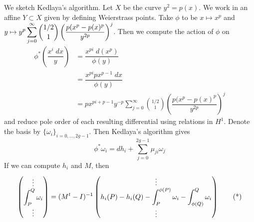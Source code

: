 \noindent{} \par\vspace{\baselineskip}
 

We sketch Kedlaya's algorithm. Let $X$ be the curve $y^2= p(x)$. We work in an affine $Y \subset X$ given by defining Weierstrass points. Take $\phi$ to be $x \mapsto x^p$ and $\displaystyle y \mapsto y^p \sum_{j=0}^\infty \binom{1/2}{1} \left( \dfrac{p(x^p - p(x)^p}{y^{2p}} \right)^j$. Then we compute the action of $\phi$ on
	\[
	\begin{aligned}
	\phi^*\left( \dfrac{x^i \;dx}{y} \right)&= \dfrac{x^{pi} \;d(x^p)}{\phi(y)} \\
	&= \dfrac{x^{pi} p x^{p-1} \;dx}{\phi(y)} \\
	&= p x^{pi + p - 1} y^{-p} \sum_{j=0}^\infty \binom{1/2}{1} \left( \dfrac{p(x^p - p(x)^p}{y^{2p}} \right)^j
	\end{aligned}
	\]
and reduce pole order of each resulting differential using relations in $H^1$. Denote the basis by $\{\omega_i\}_{i=0,\ldots,2g-1}$. Then Kedlaya's algorithm gives
	\[
	\phi^* \omega_i= dh_i + \sum_{j=0}^{2g-1} \mu_{ji} \omega_j
	\]
If we can compute $h_i$ and $M$, then
	\begin{equation} \label{eq:balk_star}
	\begin{pmatrix}
	\vdots \\
	\displaystyle \int_P^Q \omega_i \\
	\vdots
	\end{pmatrix}=
	(M^t - I)^{-1} 
	\begin{pmatrix}
	\vdots \\
	\displaystyle h_i(P) - h_i(Q) - \int_P^{\phi(P)} \omega_i - \int_{\phi(Q)}^Q \omega_i \\
	\vdots
	\end{pmatrix} 
	\tag{*}
	\end{equation}


